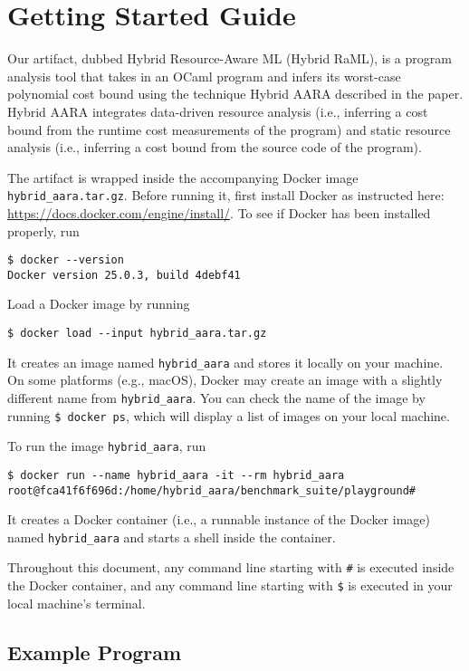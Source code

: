 
\section{Getting Started Guide}

Our artifact, dubbed Hybrid Resource-Aware ML (Hybrid RaML), is a program analysis tool
that takes in an OCaml program and infers its worst-case polynomial cost bound
using the technique Hybrid AARA described in the paper.
%
Hybrid AARA integrates data-driven resource analysis (i.e., inferring a cost
bound from the runtime cost measurements of the program) and static resource
analysis (i.e., inferring a cost bound from the source code of the program).

The artifact is wrapped inside the accompanying Docker image
\texttt{hybrid\_aara.tar.gz}.
%
Before running it, first install Docker as instructed here:
\url{https://docs.docker.com/engine/install/}.
%
To see if Docker has been installed properly, run
\begin{verbatim}
$ docker --version
Docker version 25.0.3, build 4debf41
\end{verbatim}

Load a Docker image by running
\begin{verbatim}
$ docker load --input hybrid_aara.tar.gz
\end{verbatim}
%
It creates an image named \texttt{hybrid\_aara} and stores it locally on your
machine.
%
On some platforms (e.g., macOS), Docker may create an image with a slightly
different name from \texttt{hybrid\_aara}.
%
You can check the name of the image by running \verb|$ docker ps|, which will
display a list of images on your local machine.

To run the image \texttt{hybrid\_aara}, run
\begin{verbatim}
$ docker run --name hybrid_aara -it --rm hybrid_aara
root@fca41f6f696d:/home/hybrid_aara/benchmark_suite/playground#
\end{verbatim}
%
It creates a Docker container (i.e., a runnable instance of the Docker image)
named \texttt{hybrid\_aara} and starts a shell inside the container.

Throughout this document, any command line starting with \texttt{\#} is executed
inside the Docker container, and any command line starting with \texttt{\$} is
executed in your local machine's terminal.

\subsection{Example Program}

